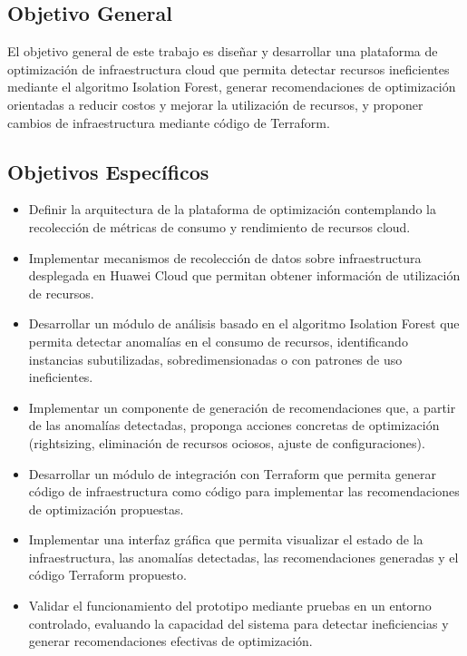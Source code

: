 \subsection{Objetivo General}

El objetivo general de este trabajo es diseñar y desarrollar una plataforma de optimización de infraestructura cloud que permita detectar recursos ineficientes mediante el algoritmo Isolation Forest, generar recomendaciones de optimización orientadas a reducir costos y mejorar la utilización de recursos, y proponer cambios de infraestructura mediante código de Terraform.

\subsection{Objetivos Específicos}

\begin{itemize}
\item Definir la arquitectura de la plataforma de optimización contemplando la recolección de métricas de consumo y rendimiento de recursos cloud.
\item Implementar mecanismos de recolección de datos sobre infraestructura desplegada en Huawei Cloud que permitan obtener información de utilización de recursos.
\item Desarrollar un módulo de análisis basado en el algoritmo Isolation Forest que permita detectar anomalías en el consumo de recursos, identificando instancias subutilizadas, sobredimensionadas o con patrones de uso ineficientes.
\item Implementar un componente de generación de recomendaciones que, a partir de las anomalías detectadas, proponga acciones concretas de optimización (rightsizing, eliminación de recursos ociosos, ajuste de configuraciones).
\item Desarrollar un módulo de integración con Terraform que permita generar código de infraestructura como código para implementar las recomendaciones de optimización propuestas.
\item Implementar una interfaz gráfica que permita visualizar el estado de la infraestructura, las anomalías detectadas, las recomendaciones generadas y el código Terraform propuesto.
\item Validar el funcionamiento del prototipo mediante pruebas en un entorno controlado, evaluando la capacidad del sistema para detectar ineficiencias y generar recomendaciones efectivas de optimización.
\end{itemize}

